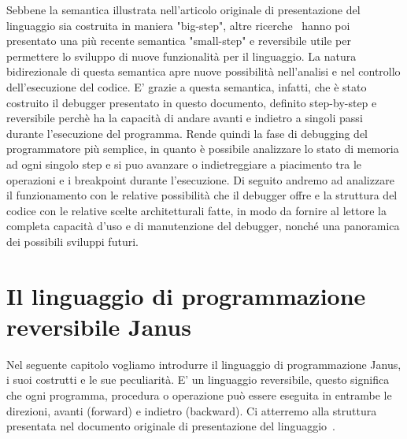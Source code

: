 \documentclass{article}
\theoremstyle{plain}
\theoremstyle{definition}
\theoremstyle{plain}
\begin{document}
Sebbene la semantica illustrata nell'articolo originale di presentazione del linguaggio sia costruita in maniera "big-step", altre ricerche~\cite{LV26} hanno poi presentato una più recente semantica "small-step" e reversibile utile per permettere lo sviluppo di nuove funzionalità per il linguaggio. La natura bidirezionale di questa semantica apre nuove possibilità nell'analisi e nel controllo dell'esecuzione del codice. E' grazie a questa semantica, infatti, che è stato costruito il debugger presentato in questo documento, definito step-by-step e reversibile perchè ha la capacità di andare avanti e indietro a singoli passi durante l'esecuzione del programma. Rende quindi la fase di debugging del programmatore più semplice, in quanto è possibile analizzare lo stato di memoria ad ogni singolo step e si puo avanzare o indietreggiare a piacimento tra le operazioni e i breakpoint durante l'esecuzione. Di seguito andremo ad analizzare il funzionamento con le relative possibilità che il debugger offre e la struttura del codice con le relative scelte architetturali fatte, in modo da fornire al lettore la completa capacità d'uso e di manutenzione del debugger, nonché una panoramica dei possibili sviluppi futuri.

\section{Il linguaggio di programmazione reversibile Janus}

Nel seguente capitolo vogliamo introdurre il linguaggio di programmazione Janus, i suoi costrutti e le sue peculiarità. E' un linguaggio reversibile, questo significa che ogni programma, procedura o operazione può essere eseguita in entrambe le direzioni, avanti (forward) e indietro (backward). Ci atterremo alla struttura presentata nel documento originale di presentazione del linguaggio~\cite{YOKOYAMA201071,LoopSem,JanusSem}.
\end{document}
